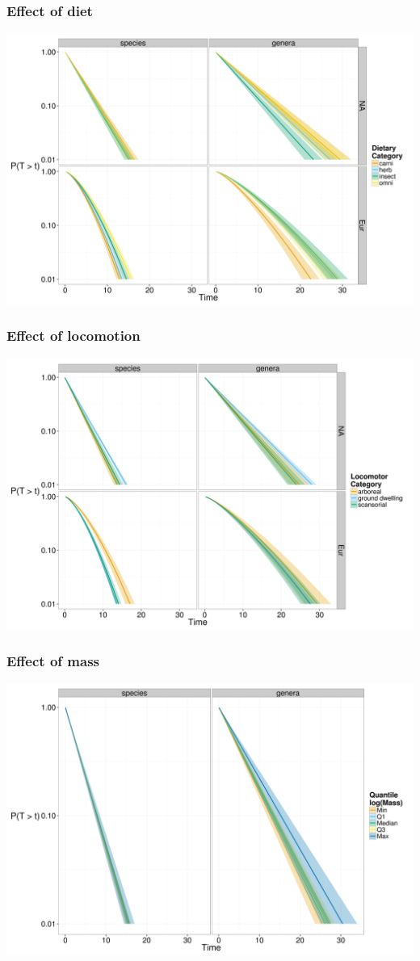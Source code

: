 \documentclass{beamer}
\begin{document}
\begin{frame}
  \frametitle{Effect of diet}
  \includegraphics[height=0.8\textheight,width=\textwidth,keepaspectratio=true]{figure/para_diet}
\end{frame}

\begin{frame}
  \frametitle{Effect of locomotion}
  \includegraphics[height=0.8\textheight,width=\textwidth,keepaspectratio=true]{figure/para_move}
\end{frame}

\begin{frame}
  \frametitle{Effect of mass}
  \includegraphics[height=0.8\textheight,width=\textwidth,keepaspectratio=true]{figure/para_mass}
\end{frame}
\end{document}
